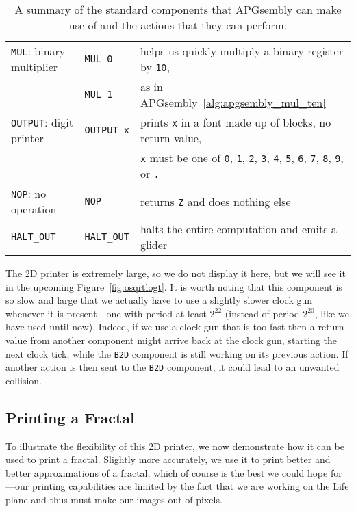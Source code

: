 \begin{table}[!htb]
\begin{tabular}{lll}
			\texttt{MUL}: binary multiplier & \texttt{MUL 0} & helps us quickly multiply a binary register by \texttt{10}, \\
			& \texttt{MUL 1} & as in APGsembly~\ref{alg:apgsembly_mul_ten} \\\midrule
			\texttt{OUTPUT}: digit printer & \texttt{OUTPUT x} & prints \texttt{x} in a font made up of blocks, no return value,\\
			& & \texttt{x} must be one of \texttt{0}, \texttt{1}, \texttt{2}, \texttt{3}, \texttt{4}, \texttt{5}, \texttt{6}, \texttt{7}, \texttt{8}, \texttt{9}, or \texttt{.}\\\midrule
			
			\texttt{NOP}: no operation & \texttt{NOP} & returns \texttt{Z} and does nothing else\\\midrule
			
			\texttt{HALT\_OUT} & \texttt{HALT\_OUT} & halts the entire computation and emits a glider\\
			\bottomrule
		\end{tabular}
	\caption{A summary of the standard components that APGsembly can make use of and the actions that they can perform.}\label{tab:universal_computation_components}
\end{table}

The 2D printer is extremely large, so we do not display it here, but we will see it in the upcoming Figure~\ref{fig:osqrtlogt}. It is worth noting that this component is so slow and large that we actually have to use a slightly slower clock gun whenever it is present---one with period at least $2^{22}$ (instead of period $2^{20}$, like we have used until now). Indeed, if we use a clock gun that is too fast then a return value from another component might arrive back at the clock gun, starting the next clock tick, while the \texttt{B2D} component is still working on its previous action. If another action is then sent to the \texttt{B2D} component, it could lead to an unwanted collision.


\subsection{Printing a Fractal}\label{sec:koch_snowflake}

To illustrate the flexibility of this 2D printer, we now demonstrate how it can be used to print a fractal. Slightly more accurately, we use it to print better and better approximations of a fractal, which of course is the best we could hope for---our printing capabilities are limited by the fact that we are working on the Life plane and thus must make our images out of pixels.

